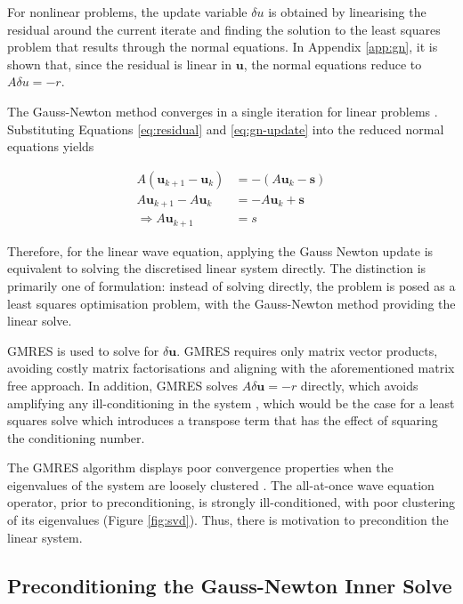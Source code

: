 \documentclass[final-report]{report-template}
\begin{document}
For nonlinear problems, the update variable $\delta u$ is obtained by linearising the residual around the current iterate and finding the solution to the least squares problem that results through the normal equations. In Appendix \ref{app:gn}, it is shown that, since the residual is linear in $\mathbf{u}$, the normal equations reduce to $A \delta u = -r$. 

The Gauss-Newton method converges in a single iteration for linear problems \cite{kelley_2_1999}. Substituting Equations \ref{eq:residual} and \ref{eq:gn-update} into the reduced normal equations yields

\begin{align}
    A(\mathbf{u}_{k+1} - \mathbf{u}_k) &= -(A\mathbf{u}_k - \mathbf{s})\\
    A\mathbf{u}_{k+1} - A\mathbf{u}_k &= -A\mathbf{u}_k + \mathbf{s}\\
    \Rightarrow A\mathbf{u}_{k+1} &= s
\end{align}

Therefore, for the linear wave equation, applying the Gauss Newton update is equivalent to solving the discretised linear system directly. The distinction is primarily one of formulation: instead of solving directly, the problem is posed as a least squares optimisation problem, with the Gauss-Newton method providing the linear solve.

GMRES is used to solve for $\delta \mathbf{u}$. GMRES \cite{gmres} requires only matrix vector products, avoiding costly matrix factorisations and aligning with the aforementioned matrix free approach. In addition, GMRES solves $A \delta \mathbf{u} = -r$ directly, which avoids amplifying any ill-conditioning in the system , which would be the case for a least squares solve which introduces a transpose term that has the effect of squaring the conditioning number. 

The GMRES algorithm displays poor convergence properties when the eigenvalues of the system are loosely clustered \cite{trefethenChapterIIIConditioning1997}. The all-at-once wave equation operator, prior to preconditioning, is strongly ill-conditioned, with poor clustering of its eigenvalues (Figure \ref{fig:svd}). Thus, there is motivation to precondition the linear system.

\subsection{Preconditioning the Gauss-Newton Inner Solve}
\label{subsubsect:precond}
\end{document}
